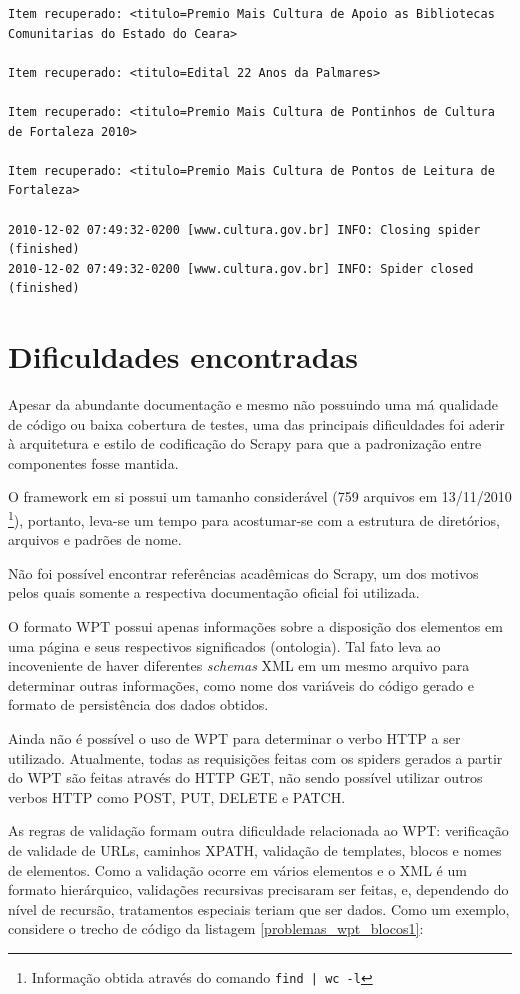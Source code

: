 \begin{lstlisting}[label=scrapy_wpt_minc]
Item recuperado: <titulo=Premio Mais Cultura de Apoio as Bibliotecas Comunitarias do Estado do Ceara> 

Item recuperado: <titulo=Edital 22 Anos da Palmares> 

Item recuperado: <titulo=Premio Mais Cultura de Pontinhos de Cultura de Fortaleza 2010> 

Item recuperado: <titulo=Premio Mais Cultura de Pontos de Leitura de Fortaleza> 

2010-12-02 07:49:32-0200 [www.cultura.gov.br] INFO: Closing spider (finished)
2010-12-02 07:49:32-0200 [www.cultura.gov.br] INFO: Spider closed (finished)
\end{lstlisting}

\pagebreak
\section{Dificuldades encontradas}

Apesar da abundante documentação e mesmo não possuindo uma má qualidade de código ou baixa cobertura de testes, uma das principais dificuldades foi aderir à arquitetura e estilo de codificação do Scrapy para que a padronização entre componentes fosse mantida.

O framework em si possui um tamanho considerável (759 arquivos em 13/11/2010 \footnote{Informação obtida através do comando \texttt{find | wc -l} }), portanto, leva-se um tempo para acostumar-se com a estrutura de diretórios, arquivos e padrões de nome.

Não foi possível encontrar referências acadêmicas do Scrapy, um dos motivos pelos quais somente a respectiva documentação oficial foi utilizada.

O formato WPT possui apenas informações sobre a disposição dos elementos em uma página e seus respectivos significados (ontologia). Tal fato leva ao incoveniente de haver diferentes \emph{schemas} XML em um mesmo arquivo para determinar outras informações, como nome dos variáveis do código gerado e formato de persistência dos dados obtidos.

Ainda não é possível o uso de WPT para determinar o verbo HTTP a ser utilizado. Atualmente, todas as requisições feitas com os spiders gerados a partir do WPT são feitas através do HTTP GET, não sendo possível utilizar outros verbos HTTP como POST, PUT, DELETE e PATCH. 

As regras de validação formam outra dificuldade relacionada ao WPT: verificação de validade de URLs, caminhos XPATH, validação de templates, blocos e nomes de elementos. Como a validação ocorre em vários elementos e o XML é um formato hierárquico, validações recursivas precisaram ser feitas, e, dependendo do nível de recursão, tratamentos especiais teriam que ser dados. Como um exemplo, considere o trecho de código da listagem \ref{problemas_wpt_blocos1}:

